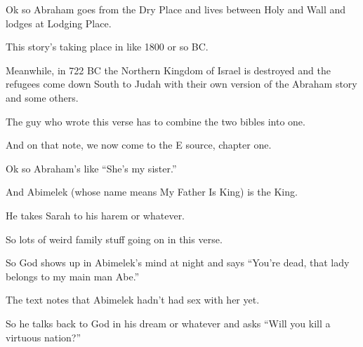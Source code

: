 

{
}
{
}
{
	Ok so Abraham goes from the Dry Place and lives between Holy and Wall and lodges at Lodging Place.

	This story's taking place in like 1800 or so BC.

	Meanwhile, in 722 BC the Northern Kingdom of Israel is destroyed and the refugees come down South to Judah with their own version of the Abraham story and some others.

	The guy who wrote this verse has to combine the two bibles into one.

	And on that note, we now come to the E source, chapter one.
}

{
}
{
}
{
	Ok so Abraham's like ``She's my sister.''

	And Abimelek (whose name means My Father Is King) is the King.

	He takes Sarah to his harem or whatever.

	So lots of weird family stuff going on in this verse.
}

{
}
{
}
{
	So God shows up in Abimelek's mind at night and says ``You're dead, that lady belongs to my main man Abe.''
}

{
}
{
}
{
	The text notes that Abimelek hadn't had sex with her yet.

	So he talks back to God in his dream or whatever and asks ``Will you kill a virtuous nation?''
}

